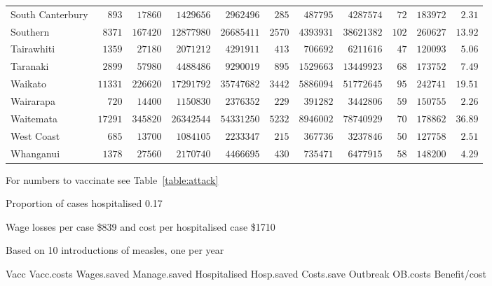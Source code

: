 \documentclass{article}
\begin{document}
\begin{itemize}
\begin{table}
\begin{center}
\begin{tabular}{lrrrrrrrrrr}
South Canterbury&$  893$&$ 17860$&$ 1429656$&$ 2962496$&$ 285$&$ 487795$&$ 4287574$&$ 72$&$183972$&$ 2.31$\tabularnewline
Southern&$ 8371$&$167420$&$12877980$&$26685411$&$2570$&$4393931$&$38621382$&$102$&$260627$&$13.92$\tabularnewline
Tairawhiti&$ 1359$&$ 27180$&$ 2071212$&$ 4291911$&$ 413$&$ 706692$&$ 6211616$&$ 47$&$120093$&$ 5.06$\tabularnewline
Taranaki&$ 2899$&$ 57980$&$ 4488486$&$ 9290019$&$ 895$&$1529663$&$13449923$&$ 68$&$173752$&$ 7.49$\tabularnewline
Waikato&$11331$&$226620$&$17291792$&$35747682$&$3442$&$5886094$&$51772645$&$ 95$&$242741$&$19.51$\tabularnewline
Wairarapa&$  720$&$ 14400$&$ 1150830$&$ 2376352$&$ 229$&$ 391282$&$ 3442806$&$ 59$&$150755$&$ 2.26$\tabularnewline
Waitemata&$17291$&$345820$&$26342544$&$54331250$&$5232$&$8946002$&$78740929$&$ 70$&$178862$&$36.89$\tabularnewline
West Coast&$  685$&$ 13700$&$ 1084105$&$ 2233347$&$ 215$&$ 367736$&$ 3237846$&$ 50$&$127758$&$ 2.51$\tabularnewline
Whanganui&$ 1378$&$ 27560$&$ 2170740$&$ 4466695$&$ 430$&$ 735471$&$ 6477915$&$ 58$&$148200$&$ 4.29$\tabularnewline
\hline
\end{tabular}\end{center}\label{table:cost20}
\begin{tablenotes}\footnotesize  
        \item For numbers to vaccinate see Table~\ref{table:attack}
        \item Proportion of cases hospitalised 0.17
        \item Wage losses per case \$839 and cost per hospitalised case \$1710
        \item Based on 10 introductions of measles, one per year
      \end{tablenotes}  
\end{table}

Vacc  Vacc.costs	Wages.saved	Manage.saved	Hospitalised	Hosp.saved	Costs.save	Outbreak	OB.costs	Benefit/cost



\end{itemize}
\end{document}
